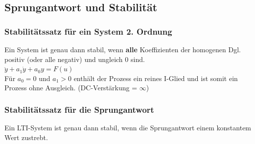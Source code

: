 	\subsection{Sprungantwort und Stabilität }
		\subsubsection{Stabilitätssatz für ein System 2. Ordnung }
			Ein System ist genau dann stabil, wenn {\bf alle} Koeffizienten der
			homogenen Dgl. positiv (oder alle negativ) und ungleich 0 sind.\\
			$\ddot{y}+a_1\dot{y}+a_0y=F(u)$ \\
			Für $a_0 = 0$ und $a_1 > 0$ enthält der Prozess ein reines I-Glied und
			ist somit ein Prozess ohne Ausgleich. (DC-Verstärkung = $\infty$)
			
		\subsubsection{Stabilitätssatz für die Sprungantwort}
			Ein LTI-System ist genau dann stabil, wenn die Sprungantwort einem
			konstantem Wert zustrebt.

